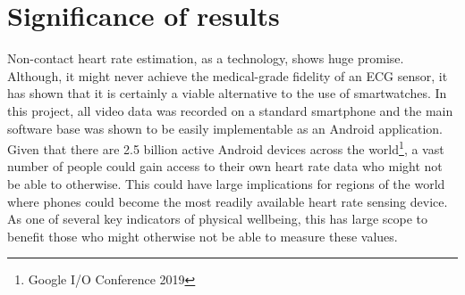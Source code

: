 

\section{Significance of results}
Non-contact heart rate estimation, as a technology, shows huge promise. Although, it might never achieve the medical-grade 
fidelity of an ECG sensor, it has shown that it is certainly a viable alternative to the use of smartwatches. In this project, all video data was 
recorded on a standard smartphone and the main software base was shown to be easily implementable as an Android application.
Given that there are 2.5 billion active Android devices across the world\footnote{Google I/O Conference 2019}, a vast number of people could gain access
to their own heart rate data who might not be able to otherwise. This could have large implications
for regions of the world where phones could become the most readily available heart rate sensing device. 
As one of several key indicators of physical wellbeing, this has large scope to benefit those who might otherwise not be able to measure these values.


